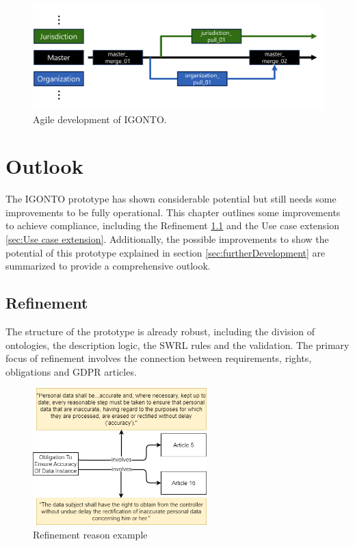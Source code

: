\documentclass[
  a4paper,  %
  twoside,  %
  bibliography=totoc,
  headsepline,
  cleardoublepage=empty,
  parskip=half,
  draft=false
]{scrbook}
\begin{document}
\begin{figure}
\centering
\includegraphics[width=\textwidth]{graphics/agileDesign.png}
\caption{Agile development of IGONTO.}
\label{fig:agileIGONTO}
\end{figure}

\chapter{Outlook}
The IGONTO prototype has shown considerable potential but still needs some improvements to be fully operational. This chapter outlines some improvements to achieve compliance, including the Refinement \ref{sec:Refinement} and the Use case extension \ref{sec:Use case extension}. Additionally, the possible improvements to show the potential of this prototype explained in section \ref{sec:furtherDevelopment} are summarized to provide a comprehensive outlook.

\section{Refinement}\label{sec:Refinement}

The structure of the prototype is already robust, including the division of ontologies, the description logic, the \acrshort{SWRL} rules and the validation. The primary focus of refinement involves the connection between requirements, rights, obligations and GDPR articles. \\

\begin{figure}
\centering
\includegraphics[width=0.6\textwidth]{graphics/refinement.drawio.png}
\caption{Refinement reason example}
\label{fig:refinement}
\end{figure}
\end{document}

